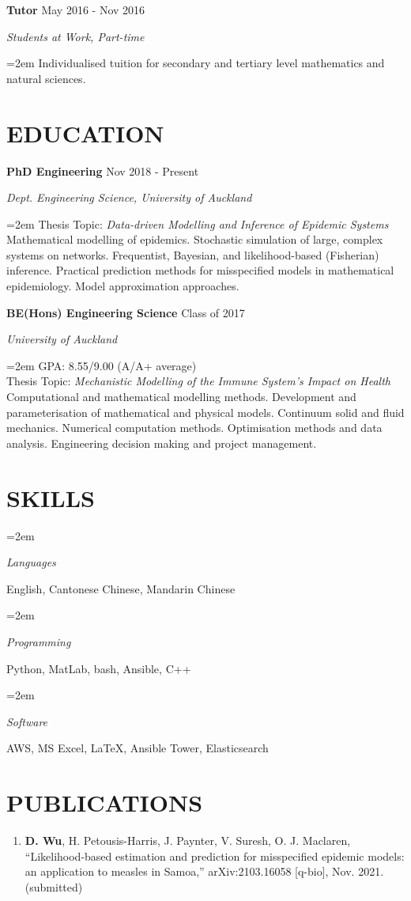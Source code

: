 \documentclass[paper=a4paper,fontsize=11pt]{scrartcl} %
\newlength{\spacebox}
\newcommand{\NewPart}[1]{\section*{\uppercase{#1}}}
\newcommand{\PersonalEntry}[2]{
		\noindent\hangindent=2em\hangafter=0 %
		\parbox{\spacebox}{        %
		\textit{#1}}		       %
		\hspace{1.5em} #2 \par}    %
\newcommand{\SkillsEntry}[2]{      %
		\noindent\hangindent=2em\hangafter=0 %
		\parbox{\spacebox}{        %
		\textit{#1}}			   %
		\hspace{1.5em} #2 \par}    %
\newcommand{\EducationEntry}[4]{
		\noindent \textbf{#1} \hfill      %
		{#2} \par  %
		\noindent \textit{#3} \par        %
		\noindent\hangindent=2em\hangafter=0 \small #4 %
		\normalsize \par\par}
\newcommand{\WorkEntry}[4]{				  %
		\noindent \textbf{#1} \hfill      %
		{#2} \par  %
		\noindent \textit{#3} \par              %
		\noindent\hangindent=2em\hangafter=0 \small #4 %
		\normalsize \par\par}
\begin{document}
\WorkEntry{Tutor}{May 2016 - Nov 2016}{Students at Work, Part-time}{Individualised tuition for secondary and tertiary level mathematics and natural sciences.}

\NewPart{Education}

\EducationEntry{PhD Engineering}{Nov 2018 - Present}{Dept. Engineering Science, University of Auckland}{Thesis Topic: \textit{Data-driven Modelling and Inference of Epidemic Systems}\\ Mathematical modelling of epidemics. Stochastic simulation of large, complex systems on networks. Frequentist, Bayesian, and likelihood-based (Fisherian) inference. Practical prediction methods for misspecified models in mathematical epidemiology. Model approximation approaches.}

\EducationEntry{BE(Hons) Engineering Science}{Class of 2017}{University of Auckland}{GPA: 8.55/9.00 (A/A+ average)\\ Thesis Topic: \textit{Mechanistic Modelling of the Immune System's Impact on Health} \\ Computational and mathematical modelling methods. Development and parameterisation of mathematical and physical models. Continuum solid and fluid mechanics. Numerical computation methods. Optimisation methods and data analysis. Engineering decision making and project management.}


\NewPart{Skills}


\SkillsEntry{Languages}{English, Cantonese Chinese, Mandarin Chinese}

\SkillsEntry{Programming}{Python, MatLab, bash, Ansible, C++}

\SkillsEntry{Software}{AWS, MS Excel, \LaTeX, Ansible Tower, Elasticsearch}%

\NewPart{Publications}
\begin{enumerate}
    \item \textbf{D. Wu}, H. Petousis-Harris, J. Paynter, V. Suresh, O. J. Maclaren, ``Likelihood-based estimation and prediction for misspecified epidemic models: an application to measles in Samoa,'' arXiv:2103.16058 [q-bio], Nov. 2021. (submitted)
\end{enumerate}
\end{document}
